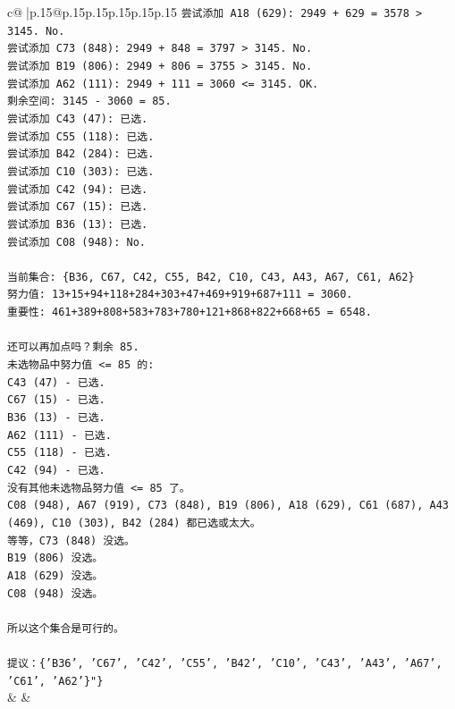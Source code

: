 \documentclass{article}
\begin{document}
{\begin{supertabular}{c@{$\;$}|p{.15\linewidth}@{}p{.15\linewidth}p{.15\linewidth}p{.15\linewidth}p{.15\linewidth}p{.15\linewidth}}
{{{\texttt{尝试添加 A18 (629): 2949 + 629 = 3578 > 3145. No.} \\
\texttt{尝试添加 C73 (848): 2949 + 848 = 3797 > 3145. No.} \\
\texttt{尝试添加 B19 (806): 2949 + 806 = 3755 > 3145. No.} \\
\texttt{尝试添加 A62 (111): 2949 + 111 = 3060 <= 3145. OK.} \\
\texttt{剩余空间: 3145 {-} 3060 = 85.} \\
\texttt{尝试添加 C43 (47): 已选.} \\
\texttt{尝试添加 C55 (118): 已选.} \\
\texttt{尝试添加 B42 (284): 已选.} \\
\texttt{尝试添加 C10 (303): 已选.} \\
\texttt{尝试添加 C42 (94): 已选.} \\
\texttt{尝试添加 C67 (15): 已选.} \\
\texttt{尝试添加 B36 (13): 已选.} \\
\texttt{尝试添加 C08 (948): No.} \\
\\ 
\texttt{当前集合: \{B36, C67, C42, C55, B42, C10, C43, A43, A67, C61, A62\}} \\
\texttt{努力值: 13+15+94+118+284+303+47+469+919+687+111 = 3060.} \\
\texttt{重要性: 461+389+808+583+783+780+121+868+822+668+65 = 6548.} \\
\\ 
\texttt{还可以再加点吗？剩余 85.} \\
\texttt{未选物品中努力值 <= 85 的:} \\
\texttt{C43 (47) {-} 已选.} \\
\texttt{C67 (15) {-} 已选.} \\
\texttt{B36 (13) {-} 已选.} \\
\texttt{A62 (111) {-} 已选.} \\
\texttt{C55 (118) {-} 已选.} \\
\texttt{C42 (94) {-} 已选.} \\
\texttt{没有其他未选物品努力值 <= 85 了。} \\
\texttt{C08 (948), A67 (919), C73 (848), B19 (806), A18 (629), C61 (687), A43 (469), C10 (303), B42 (284) 都已选或太大。} \\
\texttt{等等，C73 (848) 没选。} \\
\texttt{B19 (806) 没选。} \\
\texttt{A18 (629) 没选。} \\
\texttt{C08 (948) 没选。} \\
\\ 
\texttt{所以这个集合是可行的。} \\
\\ 
\texttt{提议：\{'B36', 'C67', 'C42', 'C55', 'B42', 'C10', 'C43', 'A43', 'A67', 'C61', 'A62'\}"\}} \\
            }
        }
    }
    & & \\ \\


\end{supertabular}}
\end{document}
